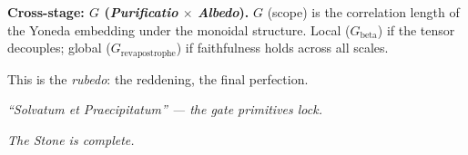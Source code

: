 \documentclass[twocolumn]{article}
\begin{document}
\bigskip
\noindent\textbf{Cross-stage: $G$ (\emph{Purificatio} $\times$ \emph{Albedo}).}\quad
$G$ (scope) is the correlation length of the Yoneda embedding under the monoidal structure.
Local ($G_{\text{beta}}$) if the tensor decouples; global ($G_{\text{revapostrophe}}$) if faithfulness holds across all scales.

\medskip
{\large This is the \emph{rubedo}: the reddening, the final perfection.}

\bigskip
\textit{\large ``Solvatum et Praecipitatum'' --- the gate primitives lock.}

\bigskip
\textit{\Large The Stone is complete.}
\end{document}
